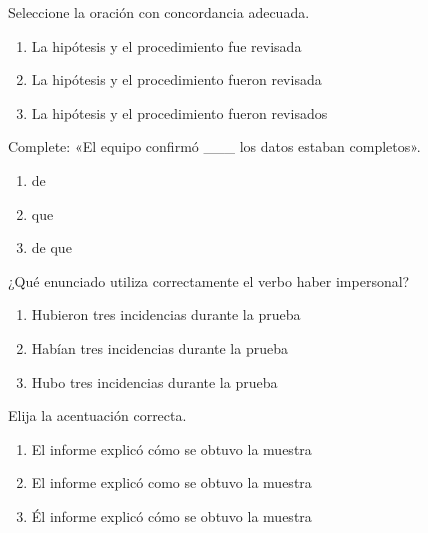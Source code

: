 \noindent\begin{minipage}{\linewidth}\setlength{\parskip}{4pt}\label{q:E-002}
Seleccione la oración con concordancia adecuada.
\begin{enumerate}[label=\Alph*),nosep]
\item La hipótesis y el procedimiento fue revisada
\item La hipótesis y el procedimiento fueron revisada
\item La hipótesis y el procedimiento fueron revisados
\end{enumerate}\end{minipage}\par\medskip

\noindent\begin{minipage}{\linewidth}\setlength{\parskip}{4pt}\label{q:E-003}
Complete: «El equipo confirmó \_\_\_ los datos estaban completos».
\begin{enumerate}[label=\Alph*),nosep]
\item de
\item que
\item de que
\end{enumerate}\end{minipage}\par\medskip

\noindent\begin{minipage}{\linewidth}\setlength{\parskip}{4pt}\label{q:E-004}
¿Qué enunciado utiliza correctamente el verbo haber impersonal?
\begin{enumerate}[label=\Alph*),nosep]
\item Hubieron tres incidencias durante la prueba
\item Habían tres incidencias durante la prueba
\item Hubo tres incidencias durante la prueba
\end{enumerate}\end{minipage}\par\medskip

\noindent\begin{minipage}{\linewidth}\setlength{\parskip}{4pt}\label{q:E-005}
Elija la acentuación correcta.
\begin{enumerate}[label=\Alph*),nosep]
\item El informe explicó cómo se obtuvo la muestra
\item El informe explicó como se obtuvo la muestra
\item Él informe explicó cómo se obtuvo la muestra
\end{enumerate}\end{minipage}\par\medskip

